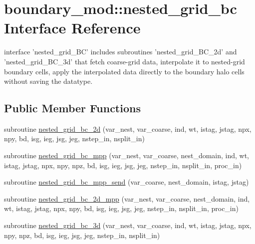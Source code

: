 \section{boundary\-\_\-mod\-:\-:nested\-\_\-grid\-\_\-bc Interface Reference}
\label{interfaceboundary__mod_1_1nested__grid__bc}


interface 'nested\-\_\-grid\-\_\-\-B\-C' includes subroutines 'nested\-\_\-grid\-\_\-\-B\-C\-\_\-2d' and 'nested\-\_\-grid\-\_\-\-B\-C\-\_\-3d' that fetch coarse-\/grid data, interpolate it to nested-\/grid boundary cells, apply the interpolated data directly to the boundary halo cells without saving the datatype.  


\subsection*{Public Member Functions}
\begin{DoxyCompactItemize}
\item 
subroutine \hyperlink{interfaceboundary__mod_1_1nested__grid__bc_acf9cfc884661a3f65f0bfa1c48ad9144}{nested\-\_\-grid\-\_\-bc\-\_\-2d} (var\-\_\-nest, var\-\_\-coarse, ind, wt, istag, jstag, npx, npy, bd, isg, ieg, jsg, jeg, nstep\-\_\-in, nsplit\-\_\-in)
\item 
subroutine \hyperlink{interfaceboundary__mod_1_1nested__grid__bc_a262e065d324866cef3ffd228b75947a9}{nested\-\_\-grid\-\_\-bc\-\_\-mpp} (var\-\_\-nest, var\-\_\-coarse, nest\-\_\-domain, ind, wt, istag, jstag, npx, npy, npz, bd, isg, ieg, jsg, jeg, nstep\-\_\-in, nsplit\-\_\-in, proc\-\_\-in)
\item 
subroutine \hyperlink{interfaceboundary__mod_1_1nested__grid__bc_a7d181c2f8cc95d8079cb7798835f1b52}{nested\-\_\-grid\-\_\-bc\-\_\-mpp\-\_\-send} (var\-\_\-coarse, nest\-\_\-domain, istag, jstag)
\item 
subroutine \hyperlink{interfaceboundary__mod_1_1nested__grid__bc_a903bffb0452936b8fa0d806378b3dc39}{nested\-\_\-grid\-\_\-bc\-\_\-2d\-\_\-mpp} (var\-\_\-nest, var\-\_\-coarse, nest\-\_\-domain, ind, wt, istag, jstag, npx, npy, bd, isg, ieg, jsg, jeg, nstep\-\_\-in, nsplit\-\_\-in, proc\-\_\-in)
\item 
subroutine \hyperlink{interfaceboundary__mod_1_1nested__grid__bc_a2339c0ee748e617bb0fd756d1e4bedbe}{nested\-\_\-grid\-\_\-bc\-\_\-3d} (var\-\_\-nest, var\-\_\-coarse, ind, wt, istag, jstag, npx, npy, npz, bd, isg, ieg, jsg, jeg, nstep\-\_\-in, nsplit\-\_\-in)
\end{DoxyCompactItemize}


